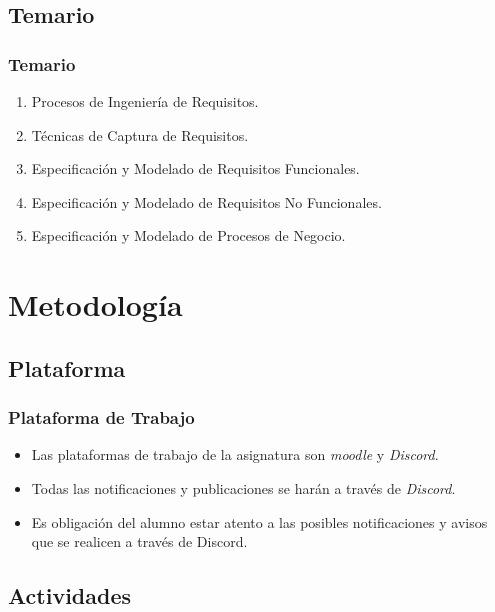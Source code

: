 \documentclass[handout,a4paper,slidestop,xcolor=pst,dvips,blue]{beamer}
\begin{document}
\subsection{Temario}

\begin{frame}[c]
	\frametitle{Temario}
	\begin{enumerate}[<+->]
		\item Procesos de Ingeniería de Requisitos.
		\item Técnicas de Captura de Requisitos.
		\item Especificación y Modelado de Requisitos Funcionales.
		\item Especificación y Modelado de Requisitos No Funcionales.
		\item Especificación y Modelado de Procesos de Negocio.
	\end{enumerate}
\end{frame}

\section{Metodología}

\subsection{Plataforma}

\begin{frame}[c]
	\frametitle{Plataforma de Trabajo}
	\begin{itemize}
		\item<1-> Las plataformas de trabajo de la asignatura son \emph{moodle} y \alert{\emph{Discord}}.
		\item<2-> Todas las notificaciones y publicaciones se harán a través de \emph{Discord}.
		\item<3-> Es obligación del alumno estar atento a las posibles notificaciones y avisos que se realicen a través de Discord.
	\end{itemize}
\end{frame}

\subsection{Actividades}
\end{document}
